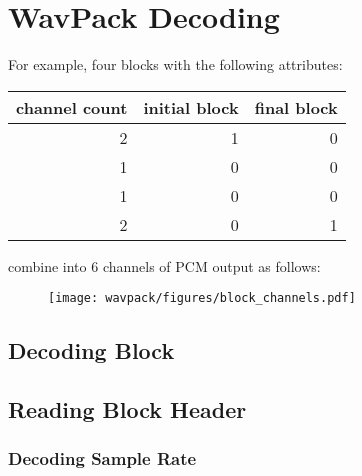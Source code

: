 
\section{WavPack Decoding}


\par
\noindent
For example, four blocks with the following attributes:
\begin{table}[h]
\begin{tabular}{rrr}
channel count & initial block & final block \\
\hline
2 & 1 & 0 \\
1 & 0 & 0 \\
1 & 0 & 0 \\
2 & 0 & 1 \\
\end{tabular}
\end{table}
\par
\noindent
combine into 6 channels of PCM output as follows:
\begin{figure}[h]
\texttt{[image: wavpack/figures/block\_channels.pdf]}
\end{figure}

\clearpage

\subsection{Decoding Block}
\label{wavpack:decode_block}
{
  
}

\clearpage

\subsection{Reading Block Header}
\label{wavpack:read_block_header}
{
  
}

\clearpage

\subsubsection{Decoding Sample Rate}
\label{wavpack:decode_sample_rate}
{

}
\clearpage

